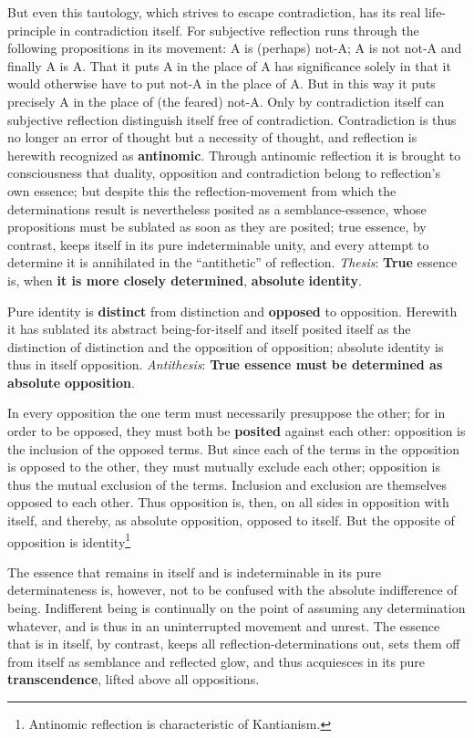 \documentclass[12pt,a4paper,openany]{book}
\newcommand{\opage}[1]{\marginnote{\footnotesize\textit{[#1]}}}
\begin{document}
But even this tautology, which strives to escape contradiction, has its real life-principle in contradiction itself. For subjective reflection runs through the following propositions in its movement: A is (perhaps) not-A; A is not not-A and finally A is A. That it puts A in the place of A has significance solely in that it would otherwise have to put not-A in the place of A. But in this way it puts precisely A in the place of (the feared) not-A. Only by contradiction itself can subjective reflection distinguish itself free of contradiction. Contradiction is thus no longer an error of thought but a necessity of thought,
\setcounter{footnote}{0}%
\opage{108}and reflection is herewith recognized as \textbf{antinomic}. Through antinomic reflection it is brought to consciousness that duality, opposition and contradiction belong to reflection's own essence; but despite this the reflection-movement from which the determinations result is nevertheless posited as a semblance-essence, whose propositions must be sublated as soon as they are posited; true essence, by contrast, keeps itself in its pure indeterminable unity, and every attempt to determine it is annihilated in the ``antithetic'' of reflection. \emph{Thesis}: \textbf{True} essence is, when \textbf{it is more closely determined}, \textbf{absolute} \textbf{identity}.

Pure identity is \textbf{distinct} from distinction and \textbf{opposed} to opposition. Herewith it has sublated its abstract being-for-itself and itself posited itself as the distinction of distinction and the opposition of opposition; absolute identity is thus in itself opposition. \emph{Antithesis}: \textbf{True essence must} \textbf{be determined as absolute} \textbf{opposition}.

In every opposition the one term must necessarily presuppose the other; for in order to be opposed, they must both be \textbf{posited} against each other: opposition is the inclusion of the opposed terms. But since each of the terms in the opposition is opposed to the other, they must mutually exclude each other; opposition is thus the mutual exclusion of the terms. Inclusion and exclusion are themselves opposed to each other. Thus opposition is, then, on all sides in opposition with itself, and thereby, as absolute opposition,
\setcounter{footnote}{0}%
\opage{109}opposed to itself. But the opposite of opposition is identity\footnote{Antinomic reflection is characteristic of Kantianism.}

The essence that remains in itself and is indeterminable in its pure determinateness is, however, not to be confused with the absolute indifference of being. Indifferent being is continually on the point of assuming any determination whatever, and is thus in an uninterrupted movement and unrest. The essence that is in itself, by contrast, keeps all reflection-determinations out, sets them off from itself as semblance and reflected glow, and thus acquiesces in its pure \textbf{transcendence}, lifted above all oppositions.
\end{document}
